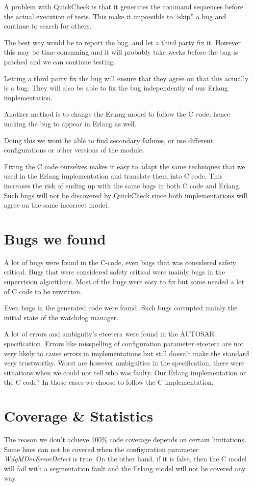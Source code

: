 \documentclass[a4paper]{article}
\begin{document}
A problem with QuickCheck is that it generates the command sequences
before the actual execution of tests. This make it impossible to
``skip'' a bug and continue to search for others.

The best way would be to report the bug, and let a third party fix
it. However this may be time consuming and it will probably take weeks
before the bug is patched and we can continue testing.

Letting a third party fix the bug will ensure that they agree on that
this actually is a bug. They will also be able to fix the bug
independently of our Erlang implementation.

Another method is to change the Erlang model to follow the C code,
hence making the bug to appear in Erlang as well.

Doing this we wont be able to find secondary failures, or use
different configurations or other versions of the module.

Fixing the C code ourselves makes it easy to adapt the same techniques
that we used in the Erlang implementation and translate them into C
code.
This increases the risk of ending up with the same bugs in both C code
and Erlang. Such bugs will not be discovered by QuickCheck since both
implementations will agree on the same incorrect model.

\section{Bugs we found}
A lot of bugs were found in the C-code, even bugs that was considered safety
critical.  Bugs that were considered safety critical were mainly bugs in the
supervision algorithms.  Most of the bugs were easy to fix but some needed a
lot of C code to be rewritten.

Even bugs in the generated code were found. Such bugs corrupted mainly the
initial state of the watchdog manager.

A lot of errors and ambiguity's etcetera were found in the AUTOSAR
specification. Errors like misspelling of configuration parameter etcetera are
not very likely to cause errors in implementations but still doesn't make the
standard very trustworthy. Worst are however ambiguities in the specification,
there were situations when we could not tell who was faulty. Our Erlang
implementation or the C code? In those cases we choose to follow the C
implementation.

\section{Coverage \& Statistics}
The reason we don't achieve 100\% code coverage depends on certain limitations.
Some lines can not be covered when the configuration parameter
\emph{WdgMDevErrorDetect} is true. On the other hand, if it is
false, then the C model will fail with a segmentation fault and the
Erlang model will not be covered any way.
\end{document}
